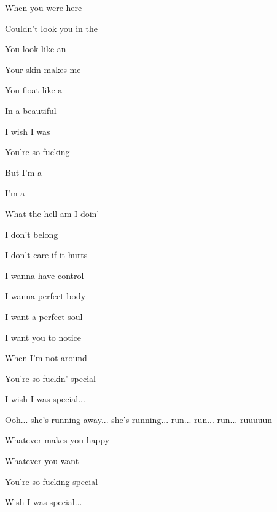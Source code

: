 

\zs                   
When you were here 

Couldn't look you in the 

You look like an 

Your skin makes me 
\ks

\zs
You float like a 

In a beautiful 

I wish I was 

You're so fucking 
\ks

\zr
But I'm a  

I'm a 

What the hell am I doin' 

I don't belong 
\kr

\zs
I don't care if it hurts

I wanna have control

I wanna perfect body

I want a perfect soul
\ks

\zs
I want you to notice

When I'm not around

You're so fuckin' special

I wish I was special...
\ks

\zr  


Ooh... she's running away... she's running... run... run... run... ruuuuun
\kr

\zs
Whatever makes you happy

Whatever you want

You're so fucking special

Wish I was special...
\ks

\zr  \kr

\kp
